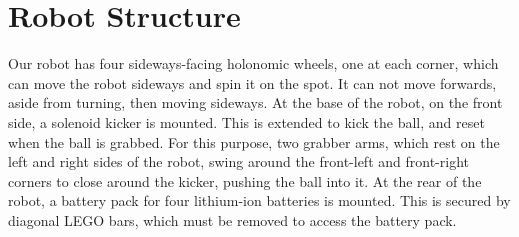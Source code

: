 \section{Robot Structure}

Our robot has four sideways-facing holonomic wheels, one at each corner, which
can move the robot sideways and spin it on the spot. It can not move forwards,
aside from turning, then moving sideways. At the base of the robot, on the
front side, a solenoid kicker is mounted. This is extended to kick the ball,
and reset when the ball is grabbed. For this purpose, two grabber arms, which
rest on the left and right sides of the robot, swing around the front-left and
front-right corners to close around the kicker, pushing the ball into it. At
the rear of the robot, a battery pack for four lithium-ion batteries is
mounted. This is secured by diagonal LEGO bars, which must be removed to access
the battery pack.
